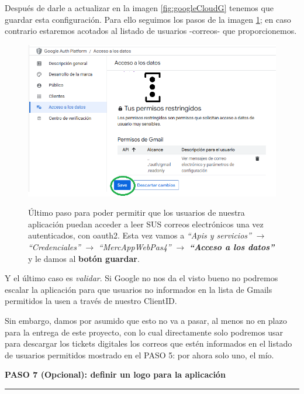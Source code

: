 \documentclass[a4paper,12pt]{report}
\begin{document}
	Después de darle a actualizar en la imagen \ref{fig:googleCloudG} tenemos que guardar esta configuración. Para ello seguimos los pasos de la imagen \ref{fig:googleCloudH}; en caso contrario estaremos acotados al listado de usuarios -correos- que proporcionemos. 
	
	
	\FloatBarrier
	\setlength{\belowcaptionskip}{3pt}
	\begin{figure}[H]
		\centering
		\caption{Último paso para poder permitir que los usuarios de nuestra aplicación puedan acceder a leer SUS correos electrónicos una vez autenticados, con oauth2. Esta vez vamos a \textit{``Apis y servicios''} $\rightarrow$ \textit{``Credenciales''} $\rightarrow$ \textit{``MercAppWebPas4''} $\rightarrow$ \textbf{\textit{``Acceso a los datos''}} y le damos al \textbf{botón guardar}. }
		\includegraphics[width=1\linewidth]{img/googleCloudH}
		\label{fig:googleCloudH}
	\end{figure}
	\FloatBarrier
	
	Y el último caso es \textit{validar}. Si Google no nos da el visto bueno no podremos escalar la aplicación para que usuarios no informados en la lista de Gmails permitidos la usen a través de nuestro ClientID.
	
	Sin embargo, damos por asumido que esto no va a pasar, al menos no en plazo para la entrega de este proyecto, con lo cual directamente solo podremos usar para descargar los tickets digitales los correos que estén informados en el listado de usuarios permitidos mostrado en el PASO 5: por ahora solo uno, el mío.
	

	
	
	\noindent \textbf{PASO 7 (Opcional): definir un logo para la aplicación}
	\vspace{.1em}
	\hrule
	\vspace{.5em}
	
\end{document}
